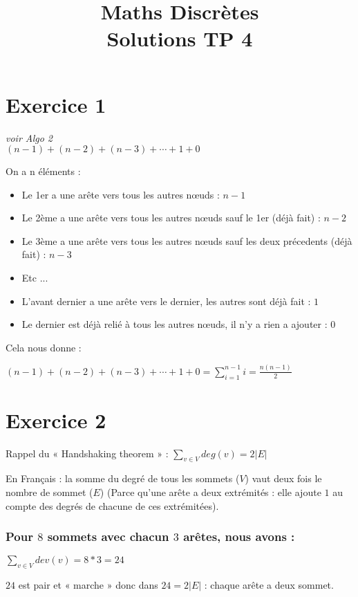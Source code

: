 \documentclass[fontsize=10pt]{article}
\title{\textbf{Maths Discrètes}\\ Solutions TP 4}
\date{}
\begin{document}
\maketitle %


\section*{Exercice 1}
\textit{voir Algo 2}\\

$(n-1) + (n-2) + (n-3) + \cdots + 1 + 0$

On a n éléments :
\begin{itemize}
    \itemsep0em
    \item Le 1er a une arête vers tous les autres nœuds : $n-1$
    \item Le 2ème a une arête vers tous les autres nœuds sauf le 1er (déjà fait) : $n-2$
    \item Le 3ème a une arête vers tous les autres nœuds sauf les deux précedents (déjà fait) : $n-3$
    \item Etc ...
    \item L'avant dernier a une arête vers le dernier, les autres sont déjà fait : $1$
    \item Le dernier est déjà relié à tous les autres nœuds, il n'y a rien a ajouter : $0$
\end{itemize}

Cela nous donne :

$(n-1) + (n-2) + (n-3) + \cdots + 1 + 0 = \displaystyle\sum_{i=1}^{n-1} i = \frac{n ( n - 1)}{2}$

\section*{Exercice 2}
Rappel du « Handshaking theorem » :
$ \displaystyle\sum_{v \in V} deg(v) = 2 |E|$

En Français : la somme du degré de tous les sommets ($V$) vaut deux fois le nombre de sommet ($E$) (Parce qu'une arête a deux extrémités : elle ajoute $1$ au compte des degrés de chacune de ces extrémitées).

\subsubsection*{Pour $8$ sommets avec chacun $3$ arêtes, nous avons :}
$\displaystyle\sum_{v \in V} dev(v) = 8 * 3 = 24$

$24$ est pair et « marche » donc dans $24 = 2 |E|$ : chaque arête a deux sommet.
\end{document}
